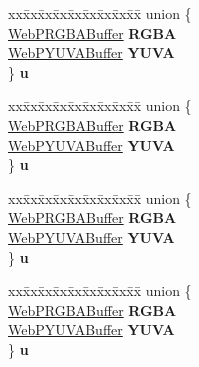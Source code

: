 \begin{DoxyCompactItemize}
\begin{tabbing}
\end{tabbing}\item 
\mbox{\label{structWebPDecBuffer_abaf7ccbbabc4c8dcd2fe129173eafa7e}} 
\begin{tabbing}
xx\=xx\=xx\=xx\=xx\=xx\=xx\=xx\=xx\=\kill
union \{\\
\>\hyperlink{structWebPRGBABuffer}{WebPRGBABuffer} {\bfseries RGBA}\\
\>\hyperlink{structWebPYUVABuffer}{WebPYUVABuffer} {\bfseries YUVA}\\
\} {\bfseries u}\\

\end{tabbing}\item 
\mbox{\label{structWebPDecBuffer_a273be237a37b62a44beceb730c5981ef}} 
\begin{tabbing}
xx\=xx\=xx\=xx\=xx\=xx\=xx\=xx\=xx\=\kill
union \{\\
\>\hyperlink{structWebPRGBABuffer}{WebPRGBABuffer} {\bfseries RGBA}\\
\>\hyperlink{structWebPYUVABuffer}{WebPYUVABuffer} {\bfseries YUVA}\\
\} {\bfseries u}\\

\end{tabbing}\item 
\mbox{\label{structWebPDecBuffer_a9842bb74cfd2c0d8414824488cf8c809}} 
\begin{tabbing}
xx\=xx\=xx\=xx\=xx\=xx\=xx\=xx\=xx\=\kill
union \{\\
\>\hyperlink{structWebPRGBABuffer}{WebPRGBABuffer} {\bfseries RGBA}\\
\>\hyperlink{structWebPYUVABuffer}{WebPYUVABuffer} {\bfseries YUVA}\\
\} {\bfseries u}\\

\end{tabbing}\item 
\mbox{\label{structWebPDecBuffer_afbbbd0b1f11cd1e1e5b4733e2b55b7e0}} 
\begin{tabbing}
xx\=xx\=xx\=xx\=xx\=xx\=xx\=xx\=xx\=\kill
union \{\\
\>\hyperlink{structWebPRGBABuffer}{WebPRGBABuffer} {\bfseries RGBA}\\
\>\hyperlink{structWebPYUVABuffer}{WebPYUVABuffer} {\bfseries YUVA}\\
\} {\bfseries u}\\


\end{tabbing}
\end{DoxyCompactItemize}
